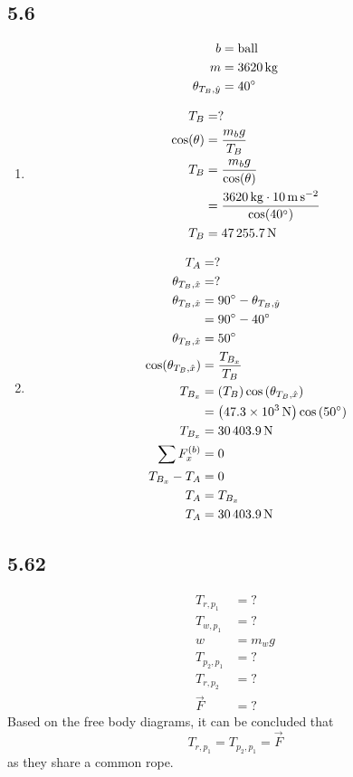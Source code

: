 \documentclass{article}
\begin{document}
\subsection{5.6}
\begin{align*}
	b & = \text{ball} \\
	m & = \SI{3620}{\kilogram} \\
	\theta_{T_B,\hat{y}} & = 40\degree
\end{align*}
\begin{enumerate}[label=\textbf{(\alph*)}]
	\item
		\begin{align*}
			T_B & = ? \\
			\cos(\theta) & = \frac{m_bg}{T_B} \\
			T_B & = \frac{m_bg}{\cos(\theta)} \\
				& = \frac{ \SI{3620}{\kilogram} \cdot \SI{10}{\meter \per \second \squared} }{ \cos(40\degree) } \\
			T_B & = \SI{47255.7}{\newton}
		\end{align*}
	\item
		\begin{align*}
			T_A & = ? \\
			\theta_{T_B, \hat{x}} & = ? \\
			\theta_{T_B, \hat{x}} & = 90\degree - \theta_{T_B, \hat{y}} \\
								  & = 90\degree - 40\degree \\
			\theta_{T_B, \hat{x}} & = 50\degree \\
			\cos(\theta_{T_B, \hat{x}}) & = \frac{T_{B_x}}{T_B} \\
			T_{B_x} & = \left( T_B \right) \cos \left( \theta_{T_B, \hat{x}} \right) \\
					& = \left( \SI{47.3e3}{\newton} \right) \cos \left( 50\degree \right) \\
			T_{B_x} & = \SI{30403.9}{\newton} \\
			\sum F_x^{(b)} & = 0 \\
			T_{B_x} - T_A & = 0 \\
			T_A & = T_{B_x} \\
			T_A & = \SI{30403.9}{\newton}
		\end{align*}
\end{enumerate}

\subsection{5.62}
\begin{align*}
	T_{r,p_1} & = ? \\
	T_{w,p_1} & = ? \\
	w & = m_wg \\
	T_{p_2,p_1} & = ? \\
	T_{r,p_2} & = ? \\
	\vec{F} & = ?
\end{align*}
Based on the free body diagrams, it can be concluded that
\begin{equation} \label{eq:1}
	T_{r,p_1} = T_{p_2,p_1} = \vec{F}
\end{equation}
as they share a common rope.
\end{document}

